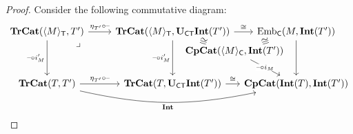 \documentclass[11pt,oneside,article]{memoir}
\begin{document}
\begin{proof}
   Consider the following commutative diagram:
   \begin{equation*}
      \begin{tikzcd}[column sep=between origins,row sep=between origins]
         \TrCat(\Col{M}_{\MTCfont{T}},T')
               \ar[r,"\eta_{T'}\circ\textrm{--}"]
               \ar[dd,"\textrm{--}\circ i'_M"']
               \ar[ddr,phantom,"\lrcorner" very near start]
            &[2.4em,between borders] \TrCat(\Col{M}_{\MTCfont{T}},\UCT\Int(T'))
               \ar[dr,phantom,"\iso"' sloped]
               \ar[dd,"\textrm{--}\circ i'_M"']
               \ar[rr,"\iso"]
            &[6.4em]
            &[6.4em] \Emb_{\MTCfont{C}}(M,\Int(T')) \ar[dd] \\[2em]
         && \CompCat(\Col{M}_{\MTCfont{C}},\Int(T'))
               \ar[ur,phantom,"\iso" sloped]
               \ar[dr,"\textrm{--}\circ i_M" {description,inner sep=.2ex}] \\[3.4em]
         \TrCat(T,T')
               \ar[r,"\eta_{T'}\circ\textrm{--}"]
               \ar[rrr,bend right=12,"\Int"']
            & \TrCat(T,\UCT\Int(T'))
               \ar[rr,"\iso"] 
            && \CompCat(\Int(T),\Int(T'))
      \end{tikzcd}
   \end{equation*}

\end{proof}
\end{document}
